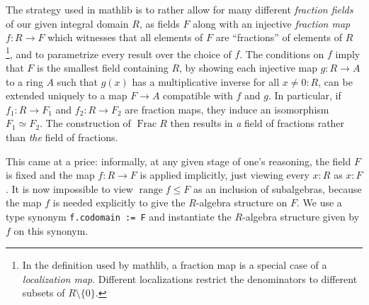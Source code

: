 \documentclass[a4paper,USenglish,cleveref, autoref, thm-restate]{lipics-v2021}
\newcommand{\lean}[1]{\texttt{#1}\xspace} %
\newcommand{\mathlib}{\textsf{mathlib}\xspace}
\newcommand{\Q}{\mathbb{Q}}
\newcommand{\Z}{\mathbb{Z}}
\DeclareMathOperator{\Frac}{Frac}
\begin{document}
The strategy used in \mathlib is to rather allow for many different \emph{fraction fields} of our given integral domain $R$,
as fields $F$ along with an injective \emph{fraction map} $f : R \to F$ which witnesses that all elements of $F$ are ``fractions'' of elements of $R$%
\footnote{In the definition used by \mathlib, a fraction map is a special case of a \emph{localization map}. Different localizations restrict the denominators to different subsets of $R \setminus \{0\}$.},
and to parametrize every result over the choice of $f$.
The conditions on $f$ imply that $F$ is the smallest field containing $R$,
by showing each injective map $g \colon R \to A$ to a ring $A$ such that $g(x)$ has a multiplicative inverse for all $x \ne 0 : R$,
can be extended uniquely to a map $F \to A$ compatible with $f$ and $g$.
In particular, if $f_1 \colon R \to F_1$ and $f_2 \colon R \to F_2$ are fraction maps, they induce an isomorphism $F_1 \simeq F_2$.
The construction of $\Frac R$ then results in \emph{a} field of fractions rather than \emph{the} field of fractions.


This came at a price: %
informally, at any given stage of one's reasoning, the field $F$ is fixed and the map $f\colon R\to F$ is applied implicitly, just viewing every $x:R$ as $x:F$.
It is now impossible to view $\mathop{range} f \leq F$ as an inclusion of subalgebras,
because the map $f$ is needed explicitly to give the $R$-algebra structure on $F$.
We use a type synonym \lean{f.codomain := F} and instantiate the $R$-algebra structure given by $f$ on this synonym.
\end{document}
